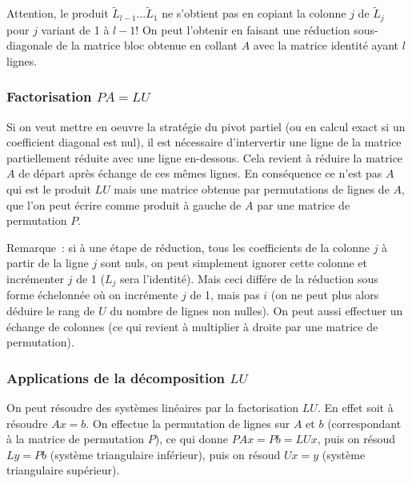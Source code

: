 \documentclass[a4paper,11pt]{article}
\begin{document}
\begin{giacjshere}
Attention, le produit $\tilde{L}_{l-1}...\tilde{L}_1$ ne s'obtient pas en
copiant la colonne $j$ de $\tilde{L}_j$ pour $j$ variant de 1 \`a
$l-1$! On peut l'obtenir en faisant
une r\'eduction sous-diagonale de la matrice bloc obtenue en collant
$A$ avec la matrice identit\'e ayant $l$ lignes.

\subsubsection{Factorisation $PA=LU$}
Si on veut mettre en oeuvre la strat\'egie du pivot partiel (ou en
calcul exact si un coefficient diagonal est nul), il est n\'ecessaire
d'intervertir une ligne de la matrice partiellement r\'eduite
avec une ligne en-dessous. Cela revient \`a r\'eduire la matrice
$A$ de d\'epart apr\`es \'echange de ces m\^emes lignes. En
cons\'equence ce n'est pas $A$ qui est le produit $LU$ mais
une matrice obtenue par permutations de lignes de $A$, que
l'on peut \'ecrire comme produit \`a gauche de $A$ par une matrice
de permutation $P$.

Remarque~: si \`a une \'etape de r\'eduction, tous les coefficients
de la colonne $j$ \`a partir de la ligne $j$ sont nuls, on peut
simplement ignorer cette colonne et incr\'ementer $j$ de 1 ($L_j$
sera l'identit\'e).
Mais ceci diff\'ere de la r\'eduction sous forme \'echelonn\'ee
o\`u on incr\'emente $j$ de 1, mais pas $i$ (on ne peut plus
alors d\'eduire le rang de $U$ du nombre de lignes non nulles).
On peut aussi effectuer un \'echange de colonnes (ce qui revient
\`a multiplier \`a droite par une matrice de permutation).

\subsubsection{Applications de la d\'ecomposition $LU$}
On peut r\'esoudre des syst\`emes lin\'eaires par la factorisation
$LU$. En effet soit \`a r\'esoudre $Ax=b$. On effectue la permutation
de lignes sur $A$ et $b$ (correspondant \`a la matrice de permutation
$P$), ce qui donne $PAx=Pb=LUx$, puis on r\'esoud $Ly=Pb$
(syst\`eme triangulaire inf\'erieur), puis on r\'esoud $Ux=y$
(syst\`eme triangulaire sup\'erieur).


\end{giacjshere}
\end{document}
